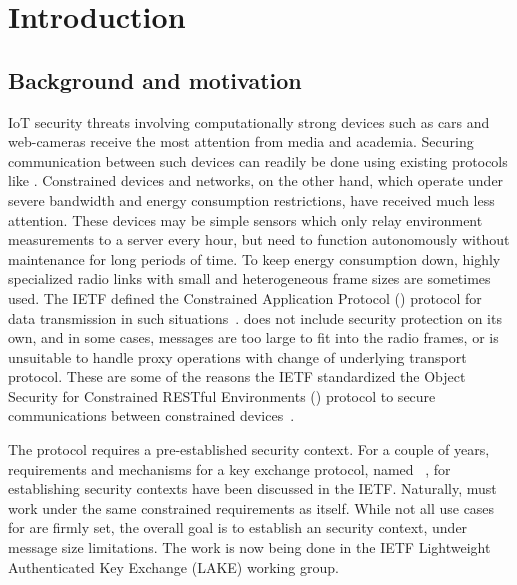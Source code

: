 \documentclass[runningheads, envcountsame, hidelinks, a4paper, x11names]{llncs}
\begin{document}
\section{Introduction}
\label{sec:introduction}

\subsection{Background and motivation}
\label{sec:motivation}
IoT security threats involving computationally strong devices such as cars
and web-cameras receive the most attention from media and academia.
%
Securing communication between such devices can readily be done using existing
protocols like \mDandTls.
%
Constrained devices and networks, on the other hand, which operate under severe
bandwidth and energy consumption restrictions, have received much less
attention.
%
These devices may be simple sensors which only relay environment
measurements to a server every hour, but need to function autonomously without
maintenance for long periods of time.
%
To keep energy consumption down, highly specialized radio links with small
and heterogeneous frame sizes are sometimes used.
%
The IETF defined the Constrained Application Protocol (\mCoap{}) protocol for
data transmission in such situations~\cite{rfc7252}.
%
\mCoap{} does not include security protection on its own, and in some cases,
\mDandTls{} messages are too large to fit into the radio frames, or is
unsuitable to handle proxy operations with change of underlying transport
protocol.
%
These are some of the reasons the IETF standardized the Object Security for
Constrained RESTful Environments
(\mOscore{}) protocol to secure communications between constrained
devices~\cite{rfc8613}.
%

The \mOscore{} protocol requires a pre-established security context.
%
For a couple of years, requirements and mechanisms for a key
exchange protocol, named \mEdhoc~\cite{selander-lake-edhoc-01}, for
establishing \mOscore{} security contexts have been discussed in the IETF.
%
Naturally, \mEdhoc{} must work under the same constrained requirements as
\mOscore{} itself.
%
While not all use cases for \mEdhoc{} are firmly set, the overall goal is to
establish an \mOscore{} security context, under message size limitations.
%
The work is now being done in the IETF Lightweight Authenticated Key Exchange
(LAKE) working group.
%
\end{document}
